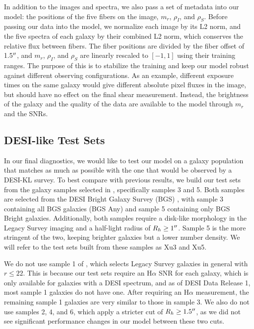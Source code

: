 In addition to the images and spectra, we also pass a set of metadata into our model: the positions of the five fibers on the image, $m_r$, $\rho_I$, and $\rho_S$.  Before passing our data into the model, we normalize each image by its L2 norm, and the five spectra of each galaxy by their combined L2 norm, which conserves the relative flux between fibers. The fiber positions are divided by the fiber offset of 1.5${^{\prime\prime}}$, and $m_r$, $\rho_I$, and $\rho_S$ are linearly rescaled to $[-1, 1]$ using their training ranges. The purpose of this is to stabilize the training and keep our model robust against different observing configurations. As an example, different exposure times on the same galaxy would give different absolute pixel fluxes in the image, but should have no effect on the final shear measurement. Instead, the brightness of the galaxy and the quality of the data are available to the model through $m_r$ and the SNRs.

\subsection{DESI-like Test Sets}
\label{ssec:test-set}

In our final diagnostics, we would like to test our model on a galaxy population that matches as much as possible with the one that would be observed by a DESI-KL survey. To best compare with previous results, we build our test sets from the galaxy samples selected in \citep{KLDESI}, specifically samples 3 and 5. Both samples are selected from the DESI Bright Galaxy Survey (BGS) \citep{BGS}, with sample 3 containing all BGS galaxies (BGS Any) and sample 5 containing only BGS Bright galaxies. Additionally, both samples require a disk-like morphology in the Legacy Survey imaging \citep{LSImaging} and a half-light radius of $R_h \geq 1{^{\prime\prime}}$. Sample 5 is the more stringent of the two, keeping brighter galaxies but a lower number density. We will refer to the test sets built from these samples as Xu3 and Xu5.

We do not use sample 1 of \citep{KLDESI}, which selects Legacy Survey galaxies in general with $r \leq 22$. This is because our test sets require an H$\alpha$ SNR for each galaxy, which is only available for galaxies with a DESI spectrum, and as of DESI Data Release 1, most sample 1 galaxies do not have one. After requiring an H$\alpha$ measurement, the remaining sample 1 galaxies are very similar to those in sample 3. We also do not use samples 2, 4, and 6, which apply a stricter cut of $R_h \geq 1.5{^{\prime\prime}}$, as we did not see significant performance changes in our model between these two cuts.


